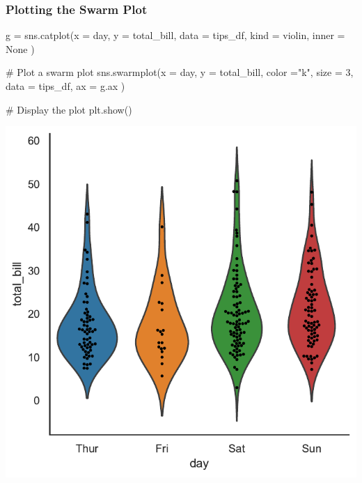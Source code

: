 \documentclass[
  letterpaper,
  DIV=11,
  numbers=noendperiod]{scrartcl}
\newenvironment{Shaded}{\begin{snugshade}}{\end{snugshade}}
\newcommand{\CommentTok}[1]{\textcolor[rgb]{0.37,0.37,0.37}{#1}}
\newcommand{\DecValTok}[1]{\textcolor[rgb]{0.68,0.00,0.00}{#1}}
\newcommand{\NormalTok}[1]{\textcolor[rgb]{0.00,0.46,0.62}{#1}}
\newcommand{\OperatorTok}[1]{\textcolor[rgb]{0.37,0.37,0.37}{#1}}
\newcommand{\StringTok}[1]{\textcolor[rgb]{0.13,0.47,0.30}{#1}}
\newcommand{\VariableTok}[1]{\textcolor[rgb]{0.07,0.07,0.07}{#1}}
\begin{document}
\hypertarget{plotting-the-swarm-plot}{%
\subsubsection{Plotting the Swarm Plot}\label{plotting-the-swarm-plot}}

\begin{Shaded}
\begin{Highlighting}[]
\NormalTok{g }\OperatorTok{=}\NormalTok{ sns.catplot(x }\OperatorTok{=} \StringTok{\textquotesingle{}day\textquotesingle{}}\NormalTok{,}
\NormalTok{                y }\OperatorTok{=} \StringTok{\textquotesingle{}total\_bill\textquotesingle{}}\NormalTok{,}
\NormalTok{                data }\OperatorTok{=}\NormalTok{ tips\_df,}
\NormalTok{                kind }\OperatorTok{=} \StringTok{\textquotesingle{}violin\textquotesingle{}}\NormalTok{,}
\NormalTok{                inner }\OperatorTok{=} \VariableTok{None}
\NormalTok{                )}
                

\CommentTok{\# Plot a swarm plot}
\NormalTok{sns.swarmplot(x }\OperatorTok{=} \StringTok{\textquotesingle{}day\textquotesingle{}}\NormalTok{, }
\NormalTok{              y }\OperatorTok{=} \StringTok{\textquotesingle{}total\_bill\textquotesingle{}}\NormalTok{, }
\NormalTok{              color }\OperatorTok{=}\StringTok{"k"}\NormalTok{, }
\NormalTok{              size }\OperatorTok{=} \DecValTok{3}\NormalTok{, }
\NormalTok{              data }\OperatorTok{=}\NormalTok{ tips\_df,}
\NormalTok{              ax }\OperatorTok{=}\NormalTok{ g.ax}
\NormalTok{            )}
            
\CommentTok{\# Display the plot}
\NormalTok{plt.show()}
\end{Highlighting}
\end{Shaded}

\includegraphics{data_visualization_with_seaborn_files/figure-pdf/cell-20-output-1.pdf}
\end{document}
